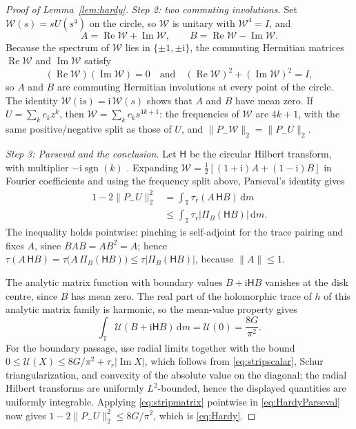 \documentclass[aps,prl,reprint,superscriptaddress,longbibliography,floatfix,raggedbottom]{revtex4-2}
\newcommand{\T}{\mathbb T}
\newcommand{\ii}{\mathrm i}
\newcommand{\dd}{\,\mathrm d}
\newcommand{\norm}[1]{\lVert #1\rVert}
\newcommand{\abs}[1]{\lvert #1\rvert}
\newcommand{\tr}{\tau}
\newcommand{\Gcat}{G}
\newcommand{\Hilb}{\mathsf H}
\begin{document}
\begin{proof}[Proof of Lemma~\ref{lem:hardy}]
\emph{Step 2: two commuting involutions.}
Set $\mathcal W(s)=sU(s^4)$ on the circle, so $\mathcal W$ is unitary
with $\mathcal W^4=I$, and
\[
A=\operatorname{Re}\mathcal W+\operatorname{Im}\mathcal W,\qquad
B=\operatorname{Re}\mathcal W-\operatorname{Im}\mathcal W .
\]
Because the spectrum of $\mathcal W$ lies in $\{\pm1,\pm\ii\}$, the
commuting Hermitian matrices $\operatorname{Re}\mathcal W$ and
$\operatorname{Im}\mathcal W$ satisfy
\[
(\operatorname{Re}\mathcal W)(\operatorname{Im}\mathcal W)=0
\quad\text{and}\quad
(\operatorname{Re}\mathcal W)^2+(\operatorname{Im}\mathcal W)^2=I,
\]
so
$A$ and $B$ are commuting Hermitian involutions at every point of the
circle. The identity $\mathcal W(\ii s)=\ii\,\mathcal W(s)$ shows that
$A$ and $B$ have mean zero. If $U=\sum_kc_kz^k$, then
$\mathcal W=\sum_kc_ks^{4k+1}$: the frequencies of $\mathcal W$ are
$4k+1$, with the same positive/negative split as those of $U$, and
$\norm{P_-\mathcal W}_2=\norm{P_-U}_2$.

\emph{Step 3: Parseval and the conclusion.}
Let $\Hilb$ be the circular Hilbert transform, with multiplier
$-\ii\operatorname{sgn}(k)$ \cite{Katznelson}. Expanding
$\mathcal W=\tfrac12[(1+\ii)A+(1-\ii)B]$ in Fourier coefficients and
using the frequency split above, Parseval's identity gives
\begin{equation}\label{eq:HardyParseval}
\begin{split}
1-2\norm{P_-U}_2^2
&=\int_{\T}\tr_r(A\,\Hilb B)\dd m\\
&\le\int_{\T}\tr_r\abs{\Pi_B(\Hilb B)}\dd m .
\end{split}
\end{equation}
The inequality holds pointwise: pinching is self-adjoint for the trace
pairing and fixes $A$, since $BAB=AB^2=A$; hence
$\tr(A\,\Hilb B)=\tr\bigl(A\,\Pi_B(\Hilb B)\bigr)
\le\tr\abs{\Pi_B(\Hilb B)}$, because $\norm A\le1$.

The analytic matrix function with boundary values $B+\ii\Hilb B$
vanishes at the disk centre, since $B$ has mean zero. The real part of the holomorphic trace of $h$
of this analytic matrix family is harmonic, so the mean-value property
gives
\[
\int_\T\mathscr U(B+\ii\Hilb B)\dd m=\mathscr U(0)=\frac{8\Gcat}{\pi^2}.
\]
For the boundary passage, use radial limits together with the bound
$0\le\mathscr U(X)\le8\Gcat/\pi^2+\tr_r\abs{\operatorname{Im}X}$, which
follows from \eqref{eq:stripscalar}, Schur triangularization, and
convexity of the absolute value on the diagonal; the radial Hilbert
transforms are uniformly $L^2$-bounded, hence the displayed quantities
are uniformly integrable. Applying \eqref{eq:stripmatrix} pointwise in
\eqref{eq:HardyParseval} now gives
$1-2\norm{P_-U}_2^2\le8\Gcat/\pi^2$, which is \eqref{eq:Hardy}.
\end{proof}
\end{document}
